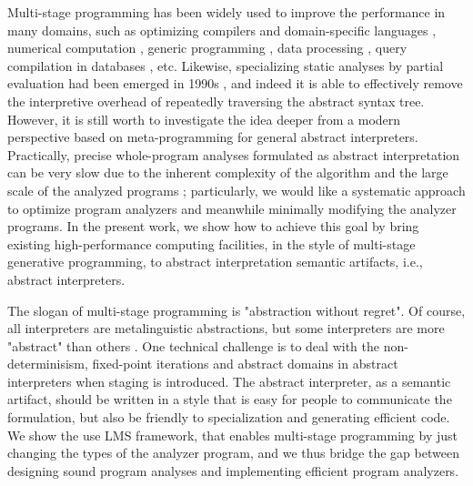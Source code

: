 Multi-stage programming has been widely used to improve the performance in many domains, 
such as optimizing compilers and domain-specific languages \cite{DBLP:conf/pldi/RompfSBLCO14, DBLP:conf/snapl/RompfBLSJAOSKDK15,
DBLP:journals/tecs/SujeethBLRCOO14, DBLP:conf/gpce/SujeethGBLROO13, DBLP:journals/jfp/CaretteKS09},
numerical computation \cite{PGL-038, DBLP:conf/pepm/AktemurKKS13}, 
generic programming \cite{DBLP:journals/pacmpl/Yallop17}, 
data processing \cite{DBLP:conf/oopsla/JonnalageddaCSRO14, DBLP:conf/popl/KiselyovBPS17}, 
query compilation in databases \cite{DBLP:conf/osdi/EssertelTDBOR18, DBLP:conf/sigmod/TahboubER18},
etc.
Likewise, specializing static analyses by partial evaluation had been emerged in 1990s 
\cite{damian1999partial, amtoft1999partial, Boucher:1996:ACN:647473.727587, ashley:practical}, 
and indeed it is able to effectively remove the interpretive overhead of 
repeatedly traversing the abstract syntax tree. However, it is still worth 
to investigate the idea deeper from a modern perspective based on meta-programming 
for general abstract interpreters. 
Practically, precise whole-program analyses formulated as abstract interpretation 
can be very slow due to the inherent complexity of the algorithm and the large scale 
of the analyzed programs \cite{toman_et_al:LIPIcs:2017:7121} ;
particularly, we would like a systematic approach to optimize program 
analyzers and meanwhile minimally modifying the analyzer programs.
In the present work, we show how to achieve this goal by bring existing 
high-performance computing facilities, in the style of multi-stage generative
programming, to abstract interpretation semantic artifacts, i.e., 
abstract interpreters. 

The slogan of multi-stage programming is "abstraction without regret". 
Of course, all interpreters are metalinguistic abstractions, but some interpreters are more "abstract"
than others . 
One technical challenge is to deal with the non-determinisism, fixed-point iterations and abstract 
domains in abstract interpreters when staging is introduced. The abstract interpreter, as a semantic artifact, 
should be written in a style that is easy for people to communicate the formulation, but also be friendly
to specialization and generating efficient code. 
We show the use LMS framework, that enables multi-stage programming by just changing the types 
of the analyzer program, and we thus bridge the gap between designing sound program analyses 
and implementing efficient program analyzers. 

